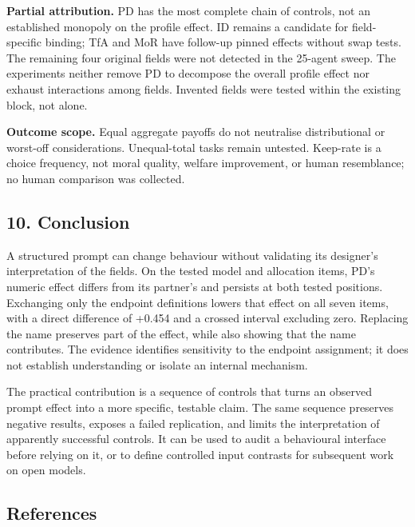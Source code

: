 \documentclass[
  11pt]{article}
\begin{document}
\textbf{Partial attribution.} PD has the most complete chain of
controls, not an established monopoly on the profile effect. ID remains
a candidate for field-specific binding; TfA and MoR have follow-up
pinned effects without swap tests. The remaining four original fields
were not detected in the 25-agent sweep. The experiments neither remove
PD to decompose the overall profile effect nor exhaust interactions
among fields. Invented fields were tested within the existing block, not
alone.

\textbf{Outcome scope.} Equal aggregate payoffs do not neutralise
distributional or worst-off considerations. Unequal-total tasks remain
untested. Keep-rate is a choice frequency, not moral quality, welfare
improvement, or human resemblance; no human comparison was collected.

\subsection{10. Conclusion}\label{conclusion}

A structured prompt can change behaviour without validating its
designer's interpretation of the fields. On the tested model and
allocation items, PD's numeric effect differs from its partner's and
persists at both tested positions. Exchanging only the endpoint
definitions lowers that effect on all seven items, with a direct
difference of +0.454 and a crossed interval excluding zero. Replacing
the name preserves part of the effect, while also showing that the name
contributes. The evidence identifies sensitivity to the endpoint
assignment; it does not establish understanding or isolate an internal
mechanism.

The practical contribution is a sequence of controls that turns an
observed prompt effect into a more specific, testable claim. The same
sequence preserves negative results, exposes a failed replication, and
limits the interpretation of apparently successful controls. It can be
used to audit a behavioural interface before relying on it, or to define
controlled input contrasts for subsequent work on open models.

\subsection{References}\label{references}
\end{document}
